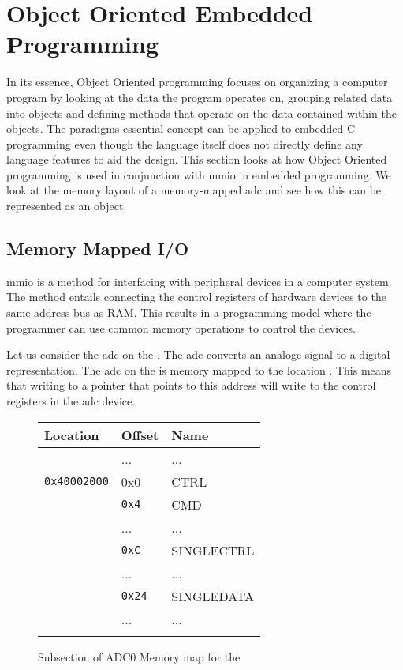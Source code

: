 \section{Object Oriented Embedded Programming}
\label{sec:back:oo}

In its essence, Object Oriented programming focuses on organizing a computer program by looking at the data the program operates on, grouping related data into objects and defining methods that operate on the data contained within the objects.
The paradigms essential concept can be applied to embedded C programming even though the language itself does not directly define any language features to aid the design.
This section looks at how Object Oriented programming is used in conjunction with \gls{mmio} in embedded programming.
We look at the memory layout of a memory-mapped \gls{adc} and see how this can be represented as an object.

\subsection{Memory Mapped I/O}
\label{ssec:memory_mapped_io}

\gls{mmio} is a method for interfacing with peripheral devices in a computer system.
The method entails connecting the control registers of hardware devices to the same address bus as RAM.
This results in a programming model where the programmer can use common memory operations to control the devices.

Let us consider the \gls{adc} on the {\gecko}.
The \gls{adc} converts an analoge signal to a digital representation.
The \gls{adc} on the {\gecko} is memory mapped to the location .
This means that writing to a pointer that points to this address will write to the control registers in the \gls{adc} device.

\begin{figure}[H]
  \centering
  \begin{tabular}{l|l|l|}
    \textbf{Location} & \textbf{Offset} & \textbf{Name} \\
    \hline
    &...&...\\
    \hline
    \hline
    \texttt{0x40002000} & 0x0 & CTRL\\
    \hline
    & \texttt{0x4} & CMD\\
    \hline
    &...&...\\
    \hline
    & \texttt{0xC} & SINGLECTRL\\
    \hline
    &...&...\\
    \hline
    & \texttt{0x24} & SINGLEDATA\\
    \hline
    &...&...\\
    \hline
    \hline
    &&\\
  \end{tabular}
  \caption{Subsection of ADC0 Memory map for the {\gecko}}
  \label{fig:back:memorymapped}
\end{figure}

